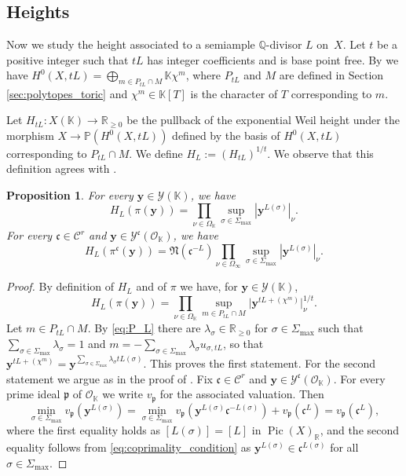 \documentclass[JEP,XML,SOM,Unicode,published]{cedram}
\newcommand{\bfy}{\boldsymbol{y}}
\newcommand{\OO}{\mathcal{O}}
\newcommand\RR{\mathbb{R}}
\newcommand\QQ{\mathbb{Q}}
\newcommand{\KK}{\mathbb{K}}
\newcommand\PP{\mathbb{P}}
\newcommand\p{\mathfrak{p}}
\newcommand{\idealnorm}{\mathfrak{N}}
\DeclareMathOperator{\pic}{Pic}
\newtheorem{prop}[theorem]{Proposition}
\theoremstyle{definition}
\numberwithin{theorem}{section}
\begin{document}
\subsection{Heights}
\label{sec:heights}
Now we study the height associated to a semiample $\QQ$-divisor $L$ on~$X$.
Let $t$ be a positive integer such that $tL$ has integer coefficients and is base point free.
By \cite[Prop.\,4.3.3]{MR2810322} we have
$H^0(X, tL)=\bigoplus_{m\in P_{tL}\cap M}\KK\chi^m$, where $P_{tL}$ and $M$
are defined in Section \ref{sec:polytopes_toric} and $\chi^m\in \KK[T]$ is
the character of $T$ corresponding to $m$.

Let $H_{tL}:X(\KK)\to\RR_{\geq0}$ be the pullback of the exponential Weil height under
the morphism $X\to\PP(H^0(X,tL))$ defined by the basis of $H^0(X,tL)$ corresponding
to $P_{tL}\cap M$.
We define $H_{L}:=(H_{tL})^{1/t}$.
We observe that this definition agrees with \cite[\S 2.1]{MR1369408}.
\begin{prop}
\label{prop:height}
For every $\bfy \in \mathscr Y({\KK})$, we have
\[
H_L(\pi(\bfy))
=\prod_{\nu\in\Omega_{\KK}} \sup_{\sigma\in\Sigma_{\max}} |\bfy^{L(\sigma)}|_{\nu}.
\]
For every $\mathfrak c\in\mathcal{C}^{r}$ and
$\bfy\in \mathscr Y^{\mathfrak c}(\mathcal{O}_{\KK})$, we have
\[
H_L(\pi^{\mathfrak c}(\bfy))
=\idealnorm \left(\mathfrak c^{-L}\right)
\prod_{\nu\in\Omega_\infty} \sup_{\sigma\in\Sigma_{\max}} | \bfy^{L(\sigma)}|_{\nu}.
\]
\end{prop}
\begin{proof}
By definition of $H_L$ and of $\pi$ we have, for $\bfy \in \mathscr Y({\KK})$,
\[
H_L(\pi(\bfy))
=\prod_{\nu\in\Omega_{\KK}} \sup_{m\in P_{tL}\cap M} \bigl| \bfy^{tL+(\chi^m)} \bigr|_{\nu}^{1/t}.
\]
Let $m\in P_{tL}\cap M$.
By \eqref{eq:P_L} there are $\lambda_\sigma\in\RR_{\geq0}$ for
$\sigma\in\Sigma_{\max}$ such that
$\sum_{\sigma\in\Sigma_{\max}}\lambda_\sigma=1$
and $m=-\sum_{\sigma\in \Sigma_{\max}}\lambda_\sigma u_{\sigma,tL}$, so that
$\bfy^{tL+(\chi^m)}= \bfy^{\sum_{\sigma\in \Sigma_{\max}}\lambda_\sigma tL(\sigma)}$.
This proves the first statement.
For the second statement we argue as in the proof of \cite[Prop.\,2]{MR3514738}.
Fix $\mathfrak c\in\mathcal{C}^{r}$ and
$\bfy\in \mathscr Y^{\mathfrak c}(\mathcal{O}_{\KK})$.
For every prime ideal $\mathfrak p$ of $\OO_{\KK}$ we write $v_\p$ for the
associated valuation. Then
\[
\min_{\sigma\in\Sigma_{\max}} v_\p(\bfy^{L(\sigma)})
=\min_{\sigma\in\Sigma_{\max}} v_\p(\bfy^{L(\sigma)}\mathfrak c^{-L(\sigma)})
+ v_\p(\mathfrak c^L)=v_\p(\mathfrak c^L),
\]
where the first equality holds as $[L(\sigma)]=[L]$ in $\pic(X)_{\RR}$, and the second equality
follows from \eqref{eq:coprimality_condition} as
$\bfy^{L(\sigma)} \in \mathfrak c^{L(\sigma)}$ for all $\sigma\in\Sigma_{\max}$.
\end{proof}
\end{document}
